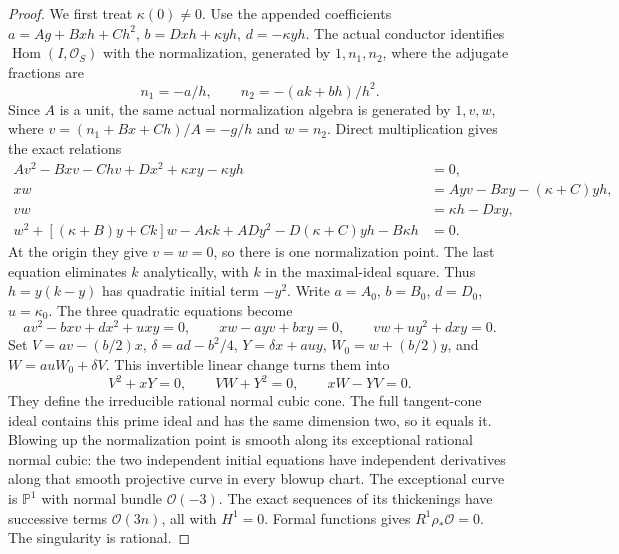 \begin{proof}
We first treat $\kappa(0)\ne0$.
Use the appended coefficients
$a=Ag+Bxh+Ch^2$, $b=Dxh+\kappa yh$,
$d=-\kappa yh$. The actual conductor identifies
$\operatorname{Hom}(I,\mathcal O_S)$ with the
normalization, generated by $1,n_1,n_2$, where the
adjugate fractions are
\[
          n_1=-a/h,\qquad n_2=-(ak+bh)/h^2.
\]
Since $A$ is a unit, the same actual normalization
algebra is generated by $1,v,w$, where
$v=(n_1+Bx+Ch)/A=-g/h$ and $w=n_2$.
Direct multiplication gives the exact relations
\begin{align*}
 Av^2-Bxv-Chv+Dx^2+\kappa xy-\kappa yh&=0,\\
 xw&=Ayv-Bxy-(\kappa+C)yh,\\
 vw&=\kappa h-Dxy,\\
 w^2+[(\kappa+B)y+Ck]w-A\kappa k+ADy^2
             -D(\kappa+C)yh-B\kappa h&=0.
\end{align*}
At the origin they give $v=w=0$, so there is one
normalization point. The last equation eliminates $k$
analytically, with $k$ in the maximal-ideal square.
Thus $h=y(k-y)$ has quadratic initial term $-y^2$.
Write $a=A_0$, $b=B_0$, $d=D_0$, $u=\kappa_0$.
The three quadratic equations become
\[
 av^2-bxv+dx^2+uxy=0,\qquad
 xw-ayv+bxy=0,\qquad vw+uy^2+dxy=0.
\]
Set $V=av-(b/2)x$, $\delta=ad-b^2/4$,
$Y=\delta x+auy$, $W_0=w+(b/2)y$, and
$W=auW_0+\delta V$. This invertible linear change
turns them into
\[
                       V^2+xY=0,\qquad
                       VW+Y^2=0,\qquad xW-YV=0.
\]
They define the irreducible rational normal cubic cone.
The full tangent-cone ideal contains this prime ideal
and has the same dimension two, so it equals it.
Blowing up the normalization point is smooth along its
exceptional rational normal cubic: the two independent
initial equations have independent derivatives along
that smooth projective curve in every blowup chart.
The exceptional curve is $\mathbb P^1$ with normal
bundle $\mathcal O(-3)$. The exact sequences of its
thickenings have successive terms $\mathcal O(3n)$,
all with $H^1=0$. Formal functions gives
$R^1\rho_*\mathcal O=0$. The singularity is rational.


\end{proof}

